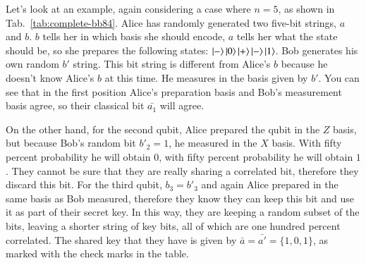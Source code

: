 Let's look at an example, again considering a case where $n=5$, as shown in Tab.~\ref{tab:complete-bb84}. Alice has randomly generated two five-bit strings, $a$ and $b$. $b$ tells her in which basis she should encode, $a$ tells her what the state should be, so she prepares the following states: $\left| - \right\rangle\left| 0 \right\rangle\left| + \right\rangle\left| - \right\rangle\left| 1 \right\rangle$. Bob generates his own random $b'$ string. This bit string is different from Alice's $b$ because he doesn't know Alice's $b$ at this time. He measures in the basis given by $b'$.  You can see that in the first position Alice's preparation basis and Bob's measurement basis agree, so their classical bit $\bar{a_1}$ will agree.


On the other hand, for the second qubit, Alice prepared the qubit in the $Z$ basis, but because Bob's random bit $b'_2 = 1$, he measured in the $X$ basis.  With fifty percent probability he will obtain $0$, with fifty percent probability he will obtain $1$. They cannot be sure that they are really sharing a correlated bit, therefore they discard this bit. For the third qubit, $b_3 = b'_3$ and again Alice prepared in the same basis as Bob measured, therefore they know they can keep this bit and use it as part of their secret key. In this way, they are keeping a random subset of the bits, leaving a shorter string of key bits, all of which are one hundred percent correlated. The shared key that they have is given by $\bar{a} = \bar{a'} = \{1, 0, 1\}$, as marked with the check marks in the table.


